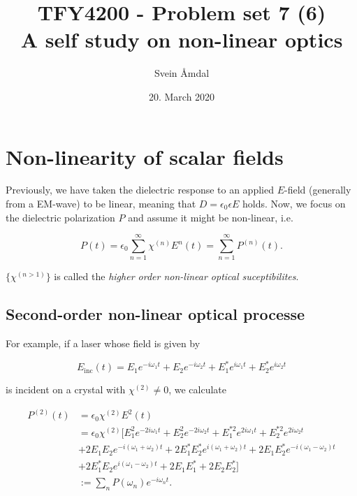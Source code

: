 \documentclass{article}
\title{TFY4200 - Problem set 7 (6) \\
A self study on non-linear optics}
\author{Svein Åmdal}
\date{20. March 2020}
\begin{document}
\maketitle

\section*{Non-linearity of scalar fields}
Previously, we have taken the dielectric response to an applied $E$-field (generally from a EM-wave) to be linear, meaning that $D=\epsilon_{0}\epsilon E$ holds. Now, we focus on the dielectric polarization $P$ and assume it might be non-linear, i.e.

\begin{equation}
\label{Polarization_expansion}
P(t) = \epsilon_{0} \sum_{n=1}^{\infty} \chi^{(n)} E^{n}(t) = \sum_{n=1}^{\infty}P^{(n)}(t).
\end{equation}

$\{\chi^{(n>1)}\}$ is called the \textit{higher order non-linear optical suceptibilites}.

\subsection*{Second-order non-linear optical processe}

For example, if a laser whose field is given by

\begin{equation}
\label{di-chromatic}
E_{\text{inc}}(t) = E_{1}e^{-i\omega_{1}t} + E_{2}e^{-i\omega_{2}t} + E_{1}^{*}e^{i\omega_{1}t} + E_{2}^{*}e^{i\omega_{2}t}
\end{equation}

is incident on a crystal with $\chi^{(2)} \neq 0$, we calculate

\begin{equation}
\begin{aligned}
P^{(2)}(t) &= \epsilon_0\chi^{(2)}E^2 (t) \\
& = \epsilon_{0}\chi^{(2)} \bigg[ E_1^2 e^{-2i\omega_1 t} + E_2^2 e^{-2i\omega_2 t} + E_1^{*2} e^{2i\omega_1 t} + E_2^{*2} e^{2i\omega_2 t} \\
& + 2E_1 E_2 e^{-i(\omega_1 + \omega_2)t} + 2E_1^{*} E_2^{*} e^{i(\omega_1 + \omega_2)t} + 2E_1 E_2^{*} e^{-i(\omega_1 - \omega_2)t} \\
& + 2E_1^{*} E_2 e^{i(\omega_1 - \omega_2)t} + 2E_1 E_1^{*} + 2E_2 E_2^{*} \bigg] \\
& := \sum_n P(\omega_n)e^{-i\omega_n t}.
\end{aligned}
\end{equation}
\end{document}
